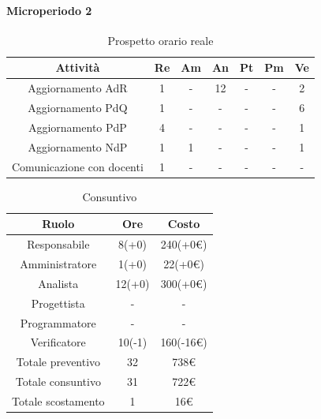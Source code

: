 \paragraph{Microperiodo 2}
\begin{table}[H]
	\centering
	\begin{tabular}{|c|c|c|c|c|c|c|}
		\hline
		\rowcolor{lighter-grayer}
		\textbf{Attività} & \textbf{Re}        & \textbf{Am}        & \textbf{An}        & \textbf{Pt}        & \textbf{Pm}        & \textbf{Ve}        \\ \hline
		
		Aggiornamento AdR & 1 & - & 12 & - & - & 2 \\ \hline
		Aggiornamento PdQ & 1 & - & - & - & - & 6 \\ \hline
		Aggiornamento PdP & 4 & - & - & - & - & 1 \\ \hline
		Aggiornamento NdP & 1 & 1 & - & - & - & 1 \\ \hline
		Comunicazione con docenti & 1 & - & - & - & - & - \\ \hline
		
	\end{tabular}
	\caption{ Prospetto orario reale\\}
\end{table}

\begin{table}[H]
	\centering
	\renewcommand{\arraystretch}{1.5}
	\begin{tabular}{|c|c|c|}
		\hline
		\rowcolor{lighter-grayer}
		Ruolo & Ore & Costo \\ \hline
		Responsabile & 8(+0) & 240(+0\euro) \\ \hline
		Amministratore & 1(+0) & 22(+0\euro) \\ \hline
		Analista & 12(+0) & 300(+0\euro) \\ \hline
		Progettista & - & - \\ \hline
		Programmatore & - & - \\ \hline
		Verificatore & 10(-1) & 160(-16\euro) \\ \hline
		Totale preventivo & 32 & 738\euro \\ \hline
		Totale consuntivo & 31 & 722\euro \\ \hline
		Totale scostamento & 1 & 16\euro \\ \hline
	\end{tabular}
	\caption{ Consuntivo\\}
\end{table}

